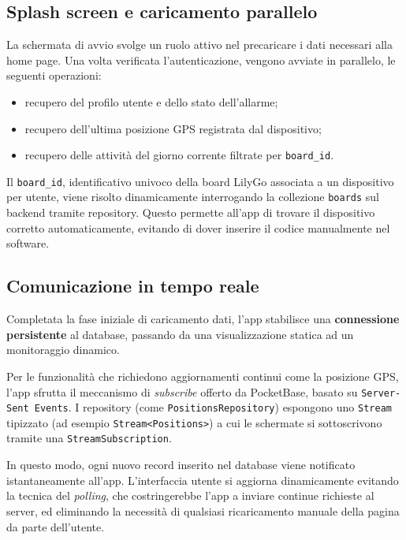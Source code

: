 \documentclass[12pt,a4paper]{article}
\begin{document}
\subsection{Splash screen e caricamento parallelo}

La schermata di avvio svolge un ruolo attivo nel precaricare i dati 
necessari alla home page. Una volta verificata l'autenticazione, 
vengono avviate in parallelo, le seguenti operazioni:

\begin{itemize}
  \item recupero del profilo utente e dello stato dell'allarme;
  \item recupero dell'ultima posizione GPS registrata dal dispositivo;
  \item recupero delle attività del giorno corrente filtrate per \texttt{board\_id}.
\end{itemize}

Il \texttt{board\_id}, identificativo univoco della board LilyGo associata a un dispositivo per utente,
viene risolto dinamicamente interrogando la collezione \texttt{boards} sul backend tramite repository.
Questo permette all'app di trovare il dispositivo corretto automaticamente, 
evitando di dover inserire il codice manualmente nel software.


\subsection{Comunicazione in tempo reale}

Completata la fase iniziale di caricamento dati, l'app stabilisce una 
\textbf{connessione persistente} al database, passando da una visualizzazione 
statica ad un monitoraggio dinamico.

Per le funzionalità che richiedono aggiornamenti continui come la posizione GPS, 
l'app sfrutta il meccanismo di \textit{subscribe} offerto da PocketBase, 
basato su \texttt{Server-Sent Events}. 
I repository (come \texttt{PositionsRepository}) espongono uno \texttt{Stream} tipizzato 
(ad esempio \texttt{Stream<Positions>}) a cui le schermate si sottoscrivono 
tramite una \texttt{StreamSubscription}.

In questo modo, ogni nuovo record inserito nel database viene notificato 
istantaneamente all'app. L'interfaccia utente si aggiorna dinamicamente 
evitando la tecnica del \textit{polling}, che costringerebbe l'app a inviare 
continue richieste al server, ed eliminando la necessità di qualsiasi ricaricamento 
manuale della pagina da parte dell'utente.
\end{document}
